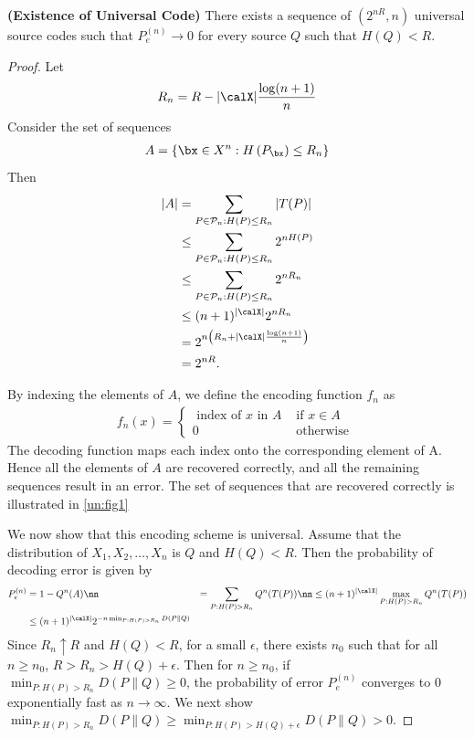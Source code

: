 \documentclass{article}
\newcommand{\bfs}[1]{\textbf{({#1})}}
\newcommand{\typss}{\mathcal{P}_n}
\begin{document}
\begin{thma}{\bfs{Existence of Universal Code}}
There exists a sequence of $\left(2^{n R}, n\right)$ universal source codes such that $P_{e}^{(n)} \rightarrow 0$ for every source $Q$ such that $H(Q)<R$.
\end{thma}
\begin{proof}
Let
\begin{align*}
R_{n}=R-| \calX | \frac{\log (n+1)}{n}
\end{align*}
Consider the set of sequences
\begin{align*}
A=\left\{ \bx \in X ^{n}: H\left(P_{ \bx }\right) \leq R_{n}\right\}
\end{align*}
Then
\begin{align*}
\begin{aligned}
|A| &=\sum_{P \in \typss: H(P) \leq R_{n}}|T(P)| \\
& \leq \sum_{P \in \typss: H(P) \leq R_{n}} 2^{n H(P)} \\
& \leq \sum_{P \in \typss: H(P) \leq R_{n}} 2^{n R_{n}} \\
& \leq(n+1)^{| \calX |} 2^{n R_{n}} \\
&=2^{n\left(R_{n}+| \calX |{\frac{\log (n+1)}{n}}\right)} \\
&=2^{n R} .
\end{aligned}
\end{align*}

By indexing the elements of $A$, we define the encoding function $f_{n}$ as
\begin{align*}
f_{n}( x )=\left\{\begin{array}{ll}
\text { index of } x \text { in } A & \text { if } x \in A \\
0 & \text { otherwise }
\end{array}\right.
\end{align*}
The decoding function maps each index onto the corresponding element of
A. Hence all the elements of $A$ are recovered correctly, and all the remaining sequences result in an error. The set of sequences that are recovered correctly is illustrated in \cref{un:fig1}

We now show that this encoding scheme is universal. Assume that the distribution of $X_{1}, X_{2}, \ldots, X_{n}$ is $Q$ and $H(Q)<R$. Then the probability of decoding error is given by
\begin{align}
P_{e}^{(n)} &=1-Q^{n}(A) \nn
&=\sum_{P: H(P)>R_{n}} Q^{n}(T(P)) \nn
& \leq(n+1)^{| \calX |} \max _{P: H(P)>R_{n}} Q^{n}(T(P)) \label{un:eq1}\\
& \leq(n+1)^{| \calX |} 2^{-n \min _{P: H(P)>R_{n}} D(P \| Q)}
\end{align}
Since $R_{n} \uparrow R$ and $H(Q)<R$, for a small $\epsilon$, there exists $n_{0}$ such that for all $n \geq n_{0}$, $R>R_{n}>H(Q)+\epsilon$. Then for $n \geq n_{0}$, if $\min _{P: H(P)>R_{n}} D(P \| Q)\ge 0$, the probability of error $P_{e}^{(n)}$ converges to $0$ exponentially fast as $n \rightarrow \infty$. We next show $\min _{P: H(P)>R_{n}} D(P \| Q)\ge \min _{P: H(P)>H(Q)+\epsilon} D(P \| Q)> 0$.


\end{proof}
\end{document}
